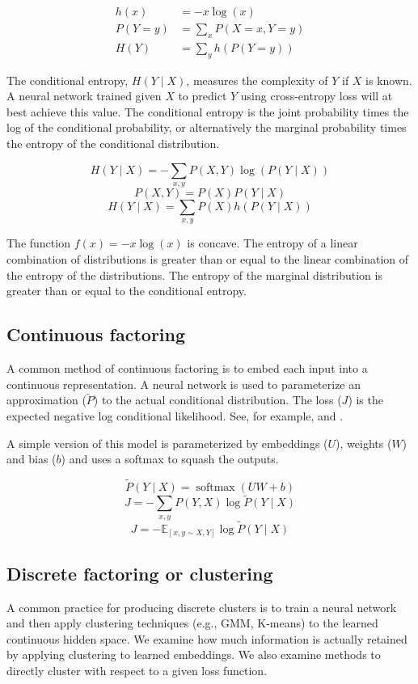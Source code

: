 \documentclass[11pt,letterpaper]{article}
\begin{document}
\begin{align*}
h(x) &= -x \log(x) \\
P(Y=y) &= \sum_x P(X=x, Y=y) \\
H(Y) &=  \sum_y h(P(Y=y))
\end{align*}

The conditional entropy, $H(Y \mid X)$, measures the complexity of $Y$ if $X$ is known. A neural network trained given $X$ to predict $Y$ using cross-entropy loss will at best achieve this value. The conditional entropy is the joint probability times the log of the conditional probability, or alternatively the marginal probability times the entropy of the conditional distribution.

$$H(Y \mid X)=-\sum_{x,y} P(X, Y) \log(P(Y \mid X)) $$
$$P(X,Y) = P(X) P(Y \mid X)$$
$$H(Y \mid X)= \sum_{x,y}  P(X) h(P(Y \mid X))$$

The function $f(x)=-x \log(x)$ is concave. The entropy of a linear combination of distributions is greater than or equal to the linear combination of the entropy of the distributions. The entropy of the marginal distribution is greater than or equal to the conditional entropy.

\subsection{Continuous factoring}

A common method of continuous factoring is to embed each input into a continuous representation. A neural network is used to parameterize an approximation ($\tilde{P}$) to the actual conditional distribution. The loss ($J$) is the expected negative log conditional likelihood. See, for example, \cite{MikolovSCCD13} and \cite{Mikolov1301}. 

A simple version of this model is parameterized by embeddings ($U$), weights ($W$) and bias ($b$) and uses a softmax to squash the outputs.

$$ \tilde{P}(Y\mid X) = \operatorname{softmax}(U W+b)$$
$$ J = -\sum_{x, y} P(Y,X) \log \tilde{P}(Y \mid X) $$
$$ J = -\mathbb{E}_{[x,y \sim X, Y]} \log \tilde{P}(Y \mid X) $$

\subsection{Discrete factoring or clustering}

A common practice for producing discrete clusters is to train a neural network and then apply clustering techniques (e.g., GMM, K-means) to the learned continuous hidden space. We examine how much information is actually retained by applying clustering to learned embeddings. We also examine methods to directly cluster with respect to a given loss function.
\end{document}
